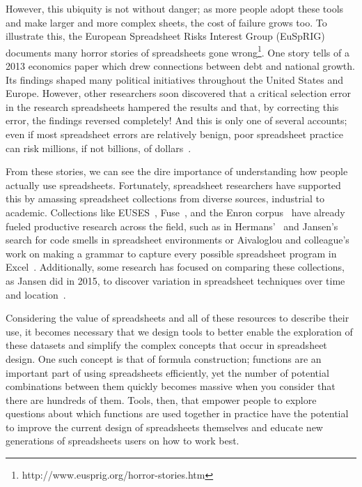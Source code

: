 \documentclass[conference]{IEEEtran}
\begin{document}
	However, this ubiquity is not without danger; as more people adopt these tools
	and make larger and more complex sheets, the cost of failure grows too. To
	illustrate this, the European Spreadsheet Risks Interest Group (EuSpRIG)
	documents many horror stories of spreadsheets gone
	wrong\footnote{http://www.eusprig.org/horror-stories.htm}. One story tells of a
	2013 economics paper which drew connections between debt and national growth.
	Its findings shaped many political initiatives throughout the United States and
	Europe. However, other researchers soon discovered that a critical selection
	error in the research spreadsheets hampered the results and that, by correcting
	this error, the findings reversed completely! And this is only one of several
	accounts; even if most spreadsheet errors are relatively benign, poor
	spreadsheet practice can risk millions, if not billions, of
	dollars~\cite{powell2009impact}.
	
	From these stories, we can see the dire importance of understanding how people
	actually use spreadsheets. Fortunately, spreadsheet researchers have supported
	this by amassing spreadsheet collections from diverse sources, industrial to
	academic. Collections like EUSES~\cite{fisher2005euses},
	Fuse~\cite{barik2015fuse}, and the Enron corpus~\cite{hermans2015enron} have
	already fueled productive research across the field, such as in
	Hermans'~\cite{hermans2012detecting} and Jansen's~\cite{jansen2015code} search
	for code smells in spreadsheet environments or Aivaloglou and colleague's work
	on making a grammar to capture every possible spreadsheet program in
	Excel~\cite{aivaloglou2015grammar}. Additionally, some research has focused on
	comparing these collections, as Jansen did in 2015, to discover variation in
	spreadsheet techniques over time and location~\cite{jansen2015enron}.
	
	Considering the value of spreadsheets and all of these resources to describe
	their use, it becomes necessary that we design tools to better enable the
	exploration of these datasets and simplify the complex concepts that occur in
	spreadsheet design. One such concept is that of formula construction; functions
	are an important part of using spreadsheets efficiently, yet the number of
	potential combinations between them quickly becomes massive when you consider that
	there are hundreds of them. Tools, then, that empower people to explore
	questions about which functions are used together in practice have the
	potential to improve the current design of spreadsheets themselves and educate
	new generations of spreadsheets users on how to work best.
	
\end{document}
